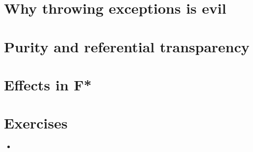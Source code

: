 \documentclass{beamer}
\begin{document}
\section{Why throwing exceptions is evil}

\section{Purity and referential transparency}


\section{Effects in F*}



\section{Exercises}


\begin{frame}{}
\begin{itemize}
	\item 
\end{itemize}
\end{frame}
\end{document}
